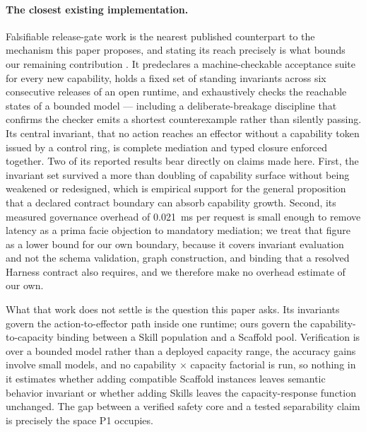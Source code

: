 \paragraph{The closest existing implementation.}
Falsifiable release-gate work is the nearest published counterpart to the mechanism this
paper proposes, and stating its reach precisely is what bounds our remaining contribution
\cite{soni2026gates}. It predeclares a machine-checkable acceptance suite for every new
capability, holds a fixed set of standing invariants across six consecutive releases of an
open runtime, and exhaustively checks the reachable states of a bounded model --- including
a deliberate-breakage discipline that confirms the checker emits a shortest counterexample
rather than silently passing. Its central invariant, that no action reaches an effector
without a capability token issued by a control ring, is complete mediation and typed
closure enforced together. Two of its reported results bear directly on claims made here.
First, the invariant set survived a more than doubling of capability surface without being
weakened or redesigned, which is empirical support for the general proposition that a
declared contract boundary can absorb capability growth. Second, its measured governance
overhead of 0.021~ms per request is small enough to remove latency as a prima facie
objection to mandatory mediation; we treat that figure as a lower bound for our own
boundary, because it covers invariant evaluation and not the schema validation, graph
construction, and binding that a resolved Harness contract also requires, and we therefore
make no overhead estimate of our own.

What that work does not settle is the question this paper asks. Its invariants govern the
action-to-effector path inside one runtime; ours govern the capability-to-capacity binding
between a Skill population and a Scaffold pool. Verification is over a bounded model rather
than a deployed capacity range, the accuracy gains involve small models, and no capability
$\times$ capacity factorial is run, so nothing in it estimates whether adding compatible
Scaffold instances leaves semantic behavior invariant or whether adding Skills leaves the
capacity-response function unchanged. The gap between a verified safety core and a tested
separability claim is precisely the space P1 occupies.

